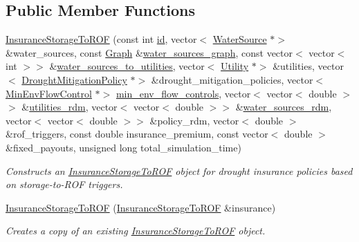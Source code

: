 \subsection*{Public Member Functions}
\begin{DoxyCompactItemize}
\item 
\mbox{\hyperlink{classInsuranceStorageToROF_a7769ebf2a6c73fa0efc55268712e8157}{Insurance\+Storage\+To\+R\+OF}} (const int \mbox{\hyperlink{classDroughtMitigationPolicy_abf3ed19ed98e0d74dc9ae24094be640b}{id}}, vector$<$ \mbox{\hyperlink{classWaterSource}{Water\+Source}} $\ast$$>$ \&water\+\_\+sources, const \mbox{\hyperlink{classGraph}{Graph}} \&\mbox{\hyperlink{classContinuityModel_a563401588c6fa622f03393909a3522db}{water\+\_\+sources\+\_\+graph}}, const vector$<$ vector$<$ int $>$$>$ \&\mbox{\hyperlink{classContinuityModel_ae8516bcbbf52650190277fc8b06c1843}{water\+\_\+sources\+\_\+to\+\_\+utilities}}, vector$<$ \mbox{\hyperlink{classUtility}{Utility}} $\ast$$>$ \&utilities, vector$<$ \mbox{\hyperlink{classDroughtMitigationPolicy}{Drought\+Mitigation\+Policy}} $\ast$$>$ \&drought\+\_\+mitigation\+\_\+policies, vector$<$ \mbox{\hyperlink{classMinEnvFlowControl}{Min\+Env\+Flow\+Control}} $\ast$$>$ \mbox{\hyperlink{classContinuityModel_afc991e5c0d144020e49a97751a04b302}{min\+\_\+env\+\_\+flow\+\_\+controls}}, vector$<$ vector$<$ double $>$$>$ \&\mbox{\hyperlink{classContinuityModel_aa4a00b76da6295d2faa11e3dcaea1896}{utilities\+\_\+rdm}}, vector$<$ vector$<$ double $>$$>$ \&\mbox{\hyperlink{classContinuityModel_ab7b8fa93a6f56b328e425e1ead6cfefa}{water\+\_\+sources\+\_\+rdm}}, vector$<$ vector$<$ double $>$$>$ \&policy\+\_\+rdm, vector$<$ double $>$ \&rof\+\_\+triggers, const double insurance\+\_\+premium, const vector$<$ double $>$ \&fixed\+\_\+payouts, unsigned long total\+\_\+simulation\+\_\+time)
\begin{DoxyCompactList}\small\item\em Constructs an \mbox{\hyperlink{classInsuranceStorageToROF}{Insurance\+Storage\+To\+R\+OF}} object for drought insurance policies based on storage-\/to-\/\+R\+OF triggers. \end{DoxyCompactList}\item 
\mbox{\hyperlink{classInsuranceStorageToROF_a5229c6bbb6da8268017c71bacec70f67}{Insurance\+Storage\+To\+R\+OF}} (\mbox{\hyperlink{classInsuranceStorageToROF}{Insurance\+Storage\+To\+R\+OF}} \&insurance)
\begin{DoxyCompactList}\small\item\em Creates a copy of an existing \mbox{\hyperlink{classInsuranceStorageToROF}{Insurance\+Storage\+To\+R\+OF}} object. \end{DoxyCompactList}\item 

\end{DoxyCompactItemize}
